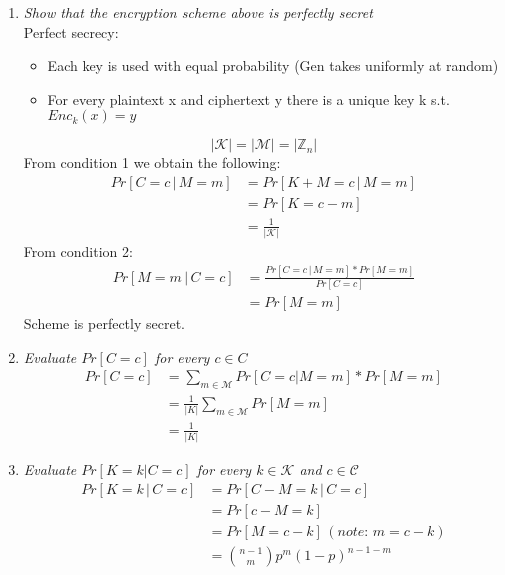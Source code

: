 \documentclass[12pt]{article}
\begin{document}
\begin{enumerate}
\item \emph{Show that the encryption scheme above is perfectly secret}\\
Perfect secrecy:\begin{itemize}
\item Each key is used with equal probability (Gen takes uniformly at random)
\item For every plaintext x and ciphertext y there is a unique key k s.t. $Enc_k(x)=y$
\end{itemize}
\begin{equation*}
|\mathcal{K}|=|\mathcal{M}|=|\mathbb{Z}_n|
\end{equation*}
From condition 1 we obtain the following:
\begin{equation*}
\begin{aligned}
    Pr[ C=c \,|\,  M=m] &= Pr[K+M=c \, | \, M = m] \\
    &= Pr[K=c-m]\\
    &= \frac{1}{|\mathcal{K}|}
\end{aligned}
\end{equation*}
From condition 2:
\begin{equation*}
\begin{aligned}
    Pr[ M=m \,|\,  C=c] &= \frac{Pr[ C=c \,|\,  M=m] * Pr[M=m]}{Pr[C=c]} \\
    &= Pr[M=m]
\end{aligned}
\end{equation*}
Scheme is perfectly secret.
\item \emph{Evaluate $Pr[C=c]$ for every $c \in C$}
\begin{equation*}
\begin{aligned}
    Pr[C=c] &= \sum\limits_{m \in \mathcal{M}} Pr[C=c | M=m]*Pr[M=m] \\
    &= \frac{1}{|K|} \sum\limits_{m \in \mathcal{M}}  Pr[M=m]\\
    &= \frac{1}{|K|}
\end{aligned}
\end{equation*}
\item \emph{Evaluate $Pr[K=k|C=c]$ for every $k \in \mathcal{K}$ and $c \in \mathcal{C}$}
\begin{equation*}
\begin{aligned}
    Pr[ K=k \,|\,  C=c] &= Pr[C-M=k \, | \, C = c] \\
    &= Pr[c-M=k]\\
    &= Pr[M=c-k] \,(note:\,m=c-k)\\
    &= \binom{n-1}{m}p^m(1-p)^{n-1-m}
\end{aligned}
\end{equation*}
\end{enumerate}
\newpage
\end{document}
